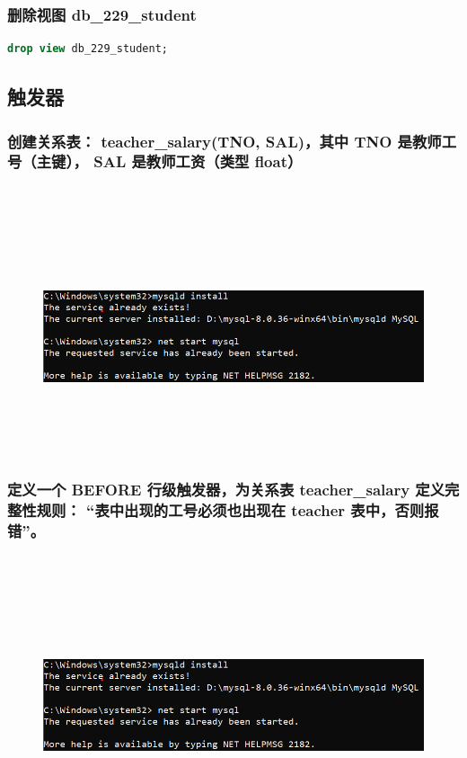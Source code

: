 \documentclass{ctexart}
\begin{document}
\subsubsection{删除视图 db\_229\_student}
\begin{lstlisting}[language=sql]
	drop view db_229_student;
\end{lstlisting}
\subsection{触发器}
\subsubsection{创建关系表： teacher\_salary(TNO, SAL)，其中 TNO 是教师工号（主键）， SAL 是教师工资（类型 float）}
\begin{lstlisting}[language=sql]
	
\end{lstlisting}
\begin{figure}[H]
	\centering 
	\includegraphics[height=7cm,width=14cm]{1.png}
	\end{figure}
\subsubsection{定义一个 BEFORE 行级触发器，为关系表 teacher\_salary 定义完整性规则： “表中出现的工号必须也出现在 teacher 表中，否则报错”。}

\begin{lstlisting}[language=sql]
	
\end{lstlisting}
\begin{figure}[H]
	\centering 
	\includegraphics[height=7cm,width=14cm]{1.png}
	\end{figure}
\end{document}
